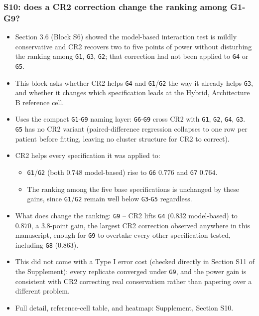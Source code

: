 \documentclass[
  11pt,
]{article}
\providecommand{\tightlist}{%
  \setlength{\itemsep}{0pt}\setlength{\parskip}{0pt}}
\begin{document}
\subsubsection{S10: does a CR2 correction change the ranking among G1-G9?}\label{s10-does-a-cr2-correction-change-the-ranking-among-g1-g9}

\begin{itemize}
\tightlist
\item
  Section 3.6 (Block S6) showed the model-based interaction test is
  mildly conservative and CR2 recovers two to five points of power
  without disturbing the ranking among \texttt{G1}, \texttt{G3}, \texttt{G2}; that
  correction had not been applied to \texttt{G4} or \texttt{G5}.
\item
  This block asks whether CR2 helps \texttt{G4} and \texttt{G1}/\texttt{G2} the way it
  already helps \texttt{G3}, and whether it changes which specification
  leads at the Hybrid, Architecture B reference cell.
\item
  Uses the compact \texttt{G1}-\texttt{G9} naming layer: \texttt{G6}-\texttt{G9} cross CR2 with
  \texttt{G1}, \texttt{G2}, \texttt{G4}, \texttt{G3}. \texttt{G5} has no CR2 variant (paired-difference
  regression collapses to one row per patient before fitting, leaving
  no cluster structure for CR2 to correct).
\item
  CR2 helps every specification it was applied to:

  \begin{itemize}
  \tightlist
  \item
    \texttt{G1}/\texttt{G2} (both \(0.748\) model-based) rise to \texttt{G6} \(0.776\) and
    \texttt{G7} \(0.764\).
  \item
    The ranking among the five base specifications is unchanged by
    these gains, since \texttt{G1}/\texttt{G2} remain well below \texttt{G3}-\texttt{G5}
    regardless.
  \end{itemize}
\item
  What does change the ranking: \texttt{G9} -- CR2 lifts \texttt{G4} (\(0.832\)
  model-based) to \(0.870\), a \(3.8\)-point gain, the largest CR2
  correction observed anywhere in this manuscript, enough for \texttt{G9}
  to overtake every other specification tested, including \texttt{G8}
  (\(0.863\)).
\item
  This did not come with a Type I error cost (checked directly in
  Section S11 of the Supplement): every replicate converged under
  \texttt{G9}, and the power gain is consistent with CR2 correcting real
  conservatism rather than papering over a different problem.
\item
  Full detail, reference-cell table, and heatmap: Supplement, Section
  S10.
\end{itemize}
\end{document}
